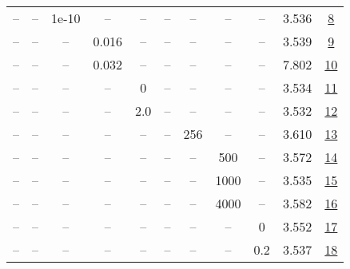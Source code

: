 \begin{table}[H]
\begin{tabular}{ccccccccccc}
-- & -- & 1e-10 & -- & -- & -- & -- & -- & -- & 3.536 & \href{https://wandb.ai/stanford-mercury/optimizer-scaling/runs/sweep-130m-2B-cautious8f13a4lr0.008-wd0.1-minlr0-warmup2000-b10.-3b6c32}{8} \\
-- & -- & -- & 0.016 & -- & -- & -- & -- & -- & 3.539 & \href{https://wandb.ai/stanford-mercury/optimizer-scaling/runs/sweep-130m-2B-cautious092ed6lr0.016-wd0.1-minlr0-warmup2000-b10.-6c1f7f}{9} \\
-- & -- & -- & 0.032 & -- & -- & -- & -- & -- & 7.802 & \href{https://wandb.ai/stanford-mercury/optimizer-scaling/runs/sweep-130m-2B-cautious249c3blr0.032-wd0.1-minlr0-warmup2000-b10.-4979cb}{10} \\
-- & -- & -- & -- & 0 & -- & -- & -- & -- & 3.534 & \href{https://wandb.ai/stanford-mercury/optimizer-scaling/runs/sweep-130m-2B-cautiouse4e71blr0.008-wd0.1-minlr0-warmup2000-b10.-60765d}{11} \\
-- & -- & -- & -- & 2.0 & -- & -- & -- & -- & 3.532 & \href{https://wandb.ai/stanford-mercury/optimizer-scaling/runs/sweep-130m-2B-cautiouse59acflr0.008-wd0.1-minlr0-warmup2000-b10.-647541}{12} \\
-- & -- & -- & -- & -- & -- & 256 & -- & -- & 3.610 & \href{https://wandb.ai/stanford-mercury/optimizer-scaling/runs/sweep-130m-2B-cautious42848elr0.008-wd0.1-minlr0-warmup2000-b10.-f45eff}{13} \\
-- & -- & -- & -- & -- & -- & -- & 500 & -- & 3.572 & \href{https://wandb.ai/stanford-mercury/optimizer-scaling/runs/sweep-130m-2B-cautious2f227flr0.008-wd0.1-minlr0-warmup500-b10.9-39f6eb}{14} \\
-- & -- & -- & -- & -- & -- & -- & 1000 & -- & 3.535 & \href{https://wandb.ai/stanford-mercury/optimizer-scaling/runs/sweep-130m-2B-cautious3c9e01lr0.008-wd0.1-minlr0-warmup1000-b10.-ee3032}{15} \\
-- & -- & -- & -- & -- & -- & -- & 4000 & -- & 3.582 & \href{https://wandb.ai/stanford-mercury/optimizer-scaling/runs/sweep-130m-2B-cautious61d1dclr0.008-wd0.1-minlr0-warmup4000-b10.-b67034}{16} \\
-- & -- & -- & -- & -- & -- & -- & -- & 0 & 3.552 & \href{https://wandb.ai/stanford-mercury/optimizer-scaling/runs/sweep-130m-2B-cautiouscb0f05lr0.008-wd0-minlr0-warmup2000-b10.95-b85932}{17} \\
-- & -- & -- & -- & -- & -- & -- & -- & 0.2 & 3.537 & \href{https://wandb.ai/stanford-mercury/optimizer-scaling/runs/sweep-130m-2B-cautious83cedalr0.008-wd0.2-minlr0-warmup2000-b10.-2881da}{18} \\
\bottomrule
\end{tabular}
\end{table}

